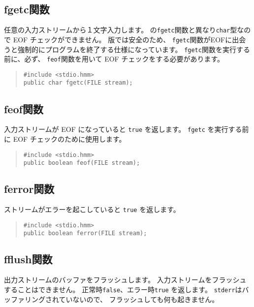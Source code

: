 \subsection{fgetc関数}

任意の入力ストリームから１文字入力します。
\cl の\verb/fgetc/関数と異なり\verb/char/型なので EOF チェックができません。
\tac 版では安全のため、
\verb/fgetc/関数がEOFに出会うと強制的にプログラムを終了する仕様になっています。
\verb/fgetc/関数を実行する前に、必ず、
\verb/feof/関数を用いて EOF チェックをする必要があります。

\begin{quote}
\begin{verbatim}
#include <stdio.hmm>
public char fgetc(FILE stream);
\end{verbatim}
\end{quote}

\subsection{feof関数}

入力ストリームが EOF になっていると \verb/true/ を返します。
\verb/fgetc/ を実行する前に EOF チェックのために使用します。

\begin{quote}
\begin{verbatim}
#include <stdio.hmm>
public boolean feof(FILE stream);
\end{verbatim}
\end{quote}

\subsection{ferror関数}

ストリームがエラーを起こしていると \verb/true/ を返します。

\begin{quote}
\begin{verbatim}
#include <stdio.hmm>
public boolean ferror(FILE stream);
\end{verbatim}
\end{quote}

\subsection{fflush関数}

出力ストリームのバッファをフラッシュします。
入力ストリームをフラッシュすることはできません。
正常時\verb/false/、エラー時\verb/true/ を返します。
\verb/stderr/はバッファリングされていないので、
フラッシュしても何も起きません。

